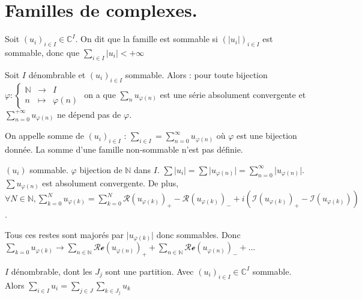 \documentclass[a4paper,12pt]{book}
\newcommand{\Def}[2]{\begin{tcolorbox}[sharp corners, colback=white,colframe=blue!90!black!75, title=Définition : #1]#2\end{tcolorbox}}
\newcommand{\Thr}[2]{\begin{tcolorbox}[sharp corners, colback=white,colframe=red!90!black!75, title=Théorème : #1]#2\end{tcolorbox}}
\newcommand{\Prop}[2]{\begin{tcolorbox}[sharp corners, colback=white,colframe=red!90!black!75, title=Proposition : #1]#2\end{tcolorbox}}
\newcommand{\Pre}[1]{\begin{tcolorbox}[sharp corners, colback=white,colframe=green!60!green!30!black!75, title=Preuve]#1\end{tcolorbox}}
\def\C{\mathbb{C}}
\def\N{\mathbb{N}}
\begin{document}
\section{Familles de complexes.}
\Def{Sommabilité complexe}{Soit $(u_i)_{i\in I}\in\C^I$. On dit que la famille est sommable si $(|u_i|)_{i\in I}$ est sommable, donc que $\sum\limits_{i\in I}|u_i|<+\infty$}
\Prop{Somme d'une famille sommable.}{Soit $I$ dénombrable et $(u_i)_{i\in I}$ sommable. Alors : pour toute bijection $\varphi:\left\{\begin{array}{rcl} \N&\to&I \\ n&\mapsto&\varphi(n)\end{array}\right.$ on a que $\sum\limits_{n}u_{\varphi(n)}$ est une série absolument convergente et $\sum\limits_{n=0}^{+\infty}u_{\varphi(n)}$ ne dépend pas de $\varphi$.
\par On appelle somme de $(u_i)_{i\in I}$ : $\sum\limits_{i\in I} =\sum\limits_{n=0}^\infty u_{\varphi(n)}$ où $\varphi$ est une bijection donnée. La somme d'une famille non-sommable n'est pas définie.}
\Pre{$(u_i)$ sommable. $\varphi$ bijection de $\N$ dans $I$. $\sum \vert u_i\vert = \sum \vert u_{\varphi(n)}\vert = \sum\limits_{n=0}^\infty\vert u_{\varphi(n)}\vert$. $\sum u_{\varphi(n)}$ est absolument convergente. De plus, $\forall N\in\N, \sum\limits_{k=0}^N u_{\varphi(k)} = \sum\limits_{k=0}^N\mathcal{R}(u_{\varphi(k)})_+ - \mathcal{R}(u_{\varphi(k)})_- + i(\mathcal{I}(u_{\varphi(k)})_+ - \mathcal{I}(u_{\varphi(k)}))$.
\par Tous ces restes sont majorés par $\vert u_{\varphi(k)}\vert$ donc sommables. Donc $\sum\limits_{k=0}u_{\varphi(k)}\to \sum\limits_{n\in\N} \mathcal{Re}(u_{\varphi(n)})_+ + \sum\limits_{n\in\N} \mathcal{Re}(u_{\varphi(n)})_-+...$}
\Thr{Sommation par paquets}{$I$ dénombrable, dont les $J_j$ sont une partition. Avec $(u_i)_{i\in I}\in\C^I$ sommable. Alors $\sum\limits_{i\in I}u_i = \sum\limits_{j\in J}\sum\limits_{k\in J_j} u_k$}
\end{document}
